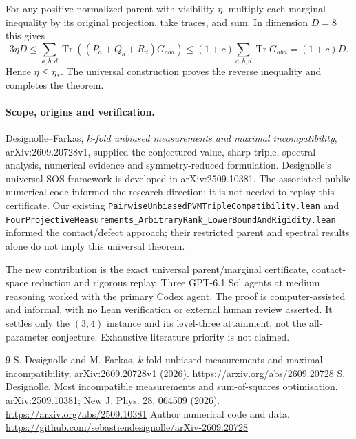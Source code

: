 \documentclass[11pt]{article}
\newcommand{\Tr}{\operatorname{Tr}}
\begin{document}
For any positive normalized parent with visibility $\eta$, multiply each marginal inequality by its original projection, take traces, and sum. In dimension $D=8$ this gives
\[
 3\eta D\leq\sum_{a,b,d}\Tr((P_a+Q_b+R_d)G_{abd})
 \leq(1+c)\sum_{a,b,d}\Tr G_{abd}=(1+c)D.
\]
Hence $\eta\leq\eta_*$. The universal construction proves the reverse inequality and completes the theorem.

\paragraph{Scope, origins and verification.}
Designolle--Farkas, \emph{$k$-fold unbiased measurements and maximal incompatibility}, arXiv:2609.20728v1, supplied the conjectured value, sharp triple, spectral analysis, numerical evidence and symmetry-reduced formulation. Designolle's universal SOS framework is developed in arXiv:2509.10381. The associated public numerical code informed the research direction; it is not needed to replay this certificate. Our existing \texttt{PairwiseUnbiasedPVMTripleCompatibility.lean} and \texttt{FourProjectiveMeasurements\_ArbitraryRank\_LowerBoundAndRigidity.lean} informed the contact/defect approach; their restricted parent and spectral results alone do not imply this universal theorem.

The new contribution is the exact universal parent/marginal certificate, contact-space reduction and rigorous replay. Three GPT-6.1 Sol agents at medium reasoning worked with the primary Codex agent. The proof is computer-assisted and informal, with no Lean verification or external human review asserted. It settles only the $(3,4)$ instance and its level-three attainment, not the all-parameter conjecture. Exhaustive literature priority is not claimed.

\begin{thebibliography}{9}
 S. Designolle and M. Farkas, $k$-fold unbiased measurements and maximal incompatibility, arXiv:2609.20728v1 (2026). \url{https://arxiv.org/abs/2609.20728}
 S. Designolle, Most incompatible measurements and sum-of-squares optimisation, arXiv:2509.10381; New J. Phys. 28, 064509 (2026). \url{https://arxiv.org/abs/2509.10381}
 Author numerical code and data. \url{https://github.com/sebastiendesignolle/arXiv-2609.20728}
\end{thebibliography}
\end{document}
